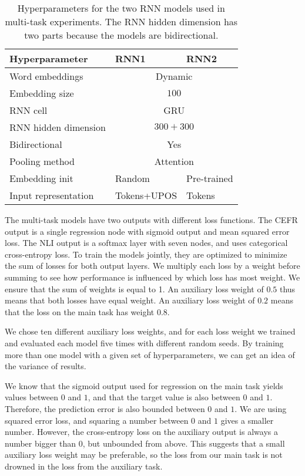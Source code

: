 \begin{table}
  \centering
  \begin{tabular}{lll}
    \toprule
    Hyperparameter       & RNN1 & RNN2 \\
    \midrule
    Word embeddings      & \multicolumn{2}{c}{Dynamic} \\
    Embedding size       & \multicolumn{2}{c}{$100$} \\
    RNN cell             & \multicolumn{2}{c}{GRU} \\
    RNN hidden dimension & \multicolumn{2}{c}{$300+300$} \\
    Bidirectional        & \multicolumn{2}{c}{Yes} \\
    Pooling method       & \multicolumn{2}{c}{Attention} \\
    Embedding init       & Random & Pre-trained \\
    Input representation & Tokens+UPOS & Tokens \\
    \bottomrule
  \end{tabular}
  \caption[Descriptions of the two RNN models]{
    Hyperparameters for the two RNN models used in multi-task experiments.
    The RNN hidden dimension has two parts because the models are
    bidirectional.
  }
  \label{tab:rnn-parameters}
\end{table}

The multi-task models have two outputs with different loss functions. The
CEFR output is a single regression node with sigmoid output and mean squared
error loss. The NLI output is a softmax layer with seven nodes, and uses
categorical cross-entropy loss. To train the models jointly, they are
optimized to minimize the sum of losses for both output layers. We multiply
each loss by a weight before summing to see how performance is influenced by
which loss has most weight. We ensure that the sum of weights is equal to 1.
An auxiliary loss weight of $0.5$ thus means that both losses have equal
weight. An auxiliary loss weight of $0.2$ means that the loss on the main
task has weight $0.8$.

We chose ten different auxiliary loss weights, and for each loss weight we
trained and evaluated each model five times with different random seeds. By
training more than one model with a given set of hyperparameters, we can get
an idea of the variance of results.

We know that the sigmoid output used for regression on the main task yields
values between $0$ and $1$, and that the target value is also between $0$ and
$1$. Therefore, the prediction error is also bounded between $0$ and $1$. We
are using squared error loss, and squaring a number between $0$ and $1$ gives
a smaller number. However, the cross-entropy loss on the auxiliary output is
always a number bigger than $0$, but unbounded from above. This suggests that
a small auxiliary loss weight may be preferable, so the loss from our main
task is not drowned in the loss from the auxiliary task.


